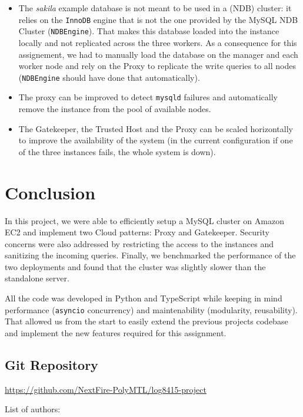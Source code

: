\documentclass[letterpaper,headings=standardclasses,parskip=half]{scrartcl}
\begin{document}
\begin{itemize}
    \item The \textit{sakila} example database is not meant to be used in a (NDB) cluster: it relies on the \texttt{InnoDB} engine that is not the one provided by the MySQL NDB Cluster (\texttt{NDBEngine}). That makes this database loaded into the instance locally and not replicated across the three workers. As a consequence for this assignement, we had to manually load the database on the manager and each worker node and rely on the Proxy to replicate the write queries to all nodes (\texttt{NDBEngine} should have done that automatically).
    \item The proxy can be improved to detect \texttt{mysqld} failures and automatically remove the instance from the pool of available nodes.
    \item The Gatekeeper, the Trusted Host and the Proxy can be scaled horizontally to improve the availability of the system (in the current configuration if one of the three instances fails, the whole system is down).
\end{itemize}

\section{Conclusion}

In this project, we were able to efficiently setup a MySQL cluster on Amazon EC2 and implement two Cloud patterns: Proxy and Gatekeeper. Security concerns were also addressed by restricting the access to the instances and sanitizing the incoming queries. Finally, we benchmarked the performance of the two deployments and found that the cluster was slightly slower than the standalone server.

All the code was developed in Python and TypeScript while keeping in mind performance (\texttt{asyncio} concurrency) and maintenability (modularity, reusability). That allowed us from the start to easily extend the previous projects codebase and implement the new features required for this assignment.


\subsection*{Git Repository}

\url{https://github.com/NextFire-PolyMTL/log8415-project}

List of authors:
\end{document}
